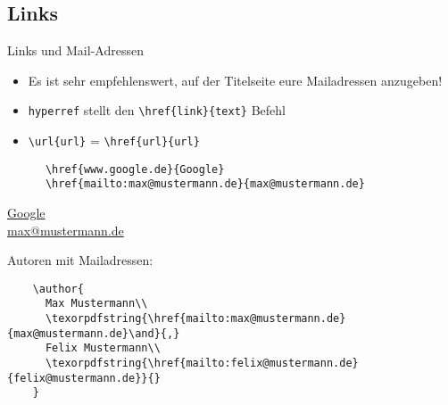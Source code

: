 \subsection{Links}
\begin{frame}[fragile]{Links und Mail-Adressen}
  \begin{itemize}
    \item Es ist sehr empfehlenswert, auf der Titelseite eure Mailadressen anzugeben!
    \item \texttt{hyperref} stellt den \lstinline+\href{link}{text}+ Befehl
    \item \lstinline+\url{url}+ = \lstinline+\href{url}{url}+
  \end{itemize}
  \vspace{-0.5em}
  \begin{CodeExample}{0.5}
    \begin{lstlisting}
      \href{www.google.de}{Google}
      \href{mailto:max@mustermann.de}{max@mustermann.de}
    \end{lstlisting}
    \CodeResult
    \href{www.google.de}{Google}\\
    \href{mailto:max@mustermann.de}{max@mustermann.de}
  \end{CodeExample}
  \begin{block}{Autoren mit Mailadressen:}
    \begin{lstlisting}
    \author{
      Max Mustermann\\
      \texorpdfstring{\href{mailto:max@mustermann.de}{max@mustermann.de}\and}{,}
      Felix Mustermann\\
      \texorpdfstring{\href{mailto:felix@mustermann.de}{felix@mustermann.de}}{}
    }
    \end{lstlisting}
  \end{block}
\end{frame}
